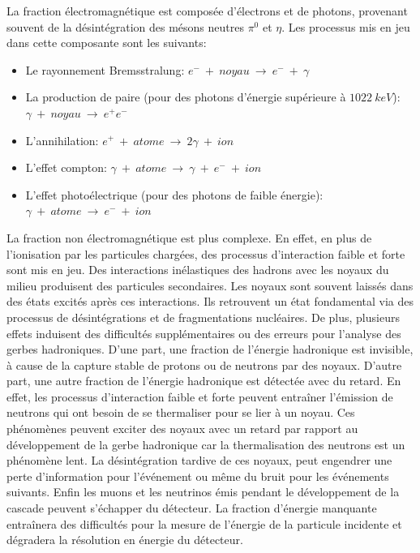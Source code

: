 La fraction électromagnétique est composée d'électrons et de photons, provenant souvent de la désintégration des mésons neutres $\pi^{0}$ et $\eta$. Les processus mis en jeu dans cette composante sont les suivants:  
\begin{itemize}
\item Le rayonnement Bremsstralung: $e^-~+~noyau~\rightarrow~e^-~+~\gamma$ 
\item La production de paire (pour des photons d'énergie supérieure à $1022\ keV$): $\gamma~+~noyau~\rightarrow~e^+e^-$  
\item L'annihilation: $e^+~+~atome~\rightarrow~2\gamma~+~ion$
\item L'effet compton: $\gamma~+~atome~\rightarrow~\gamma~+~e^-~+~ion$
\item L'effet photoélectrique (pour des photons de faible énergie): $\gamma~+~atome~\rightarrow~e^-~+~ion$ 
\end{itemize}
La fraction non électromagnétique est plus complexe. En effet, en plus de l’ionisation par les particules chargées, des processus d'interaction faible et forte sont mis en jeu. Des interactions inélastiques des hadrons avec les noyaux du milieu produisent des particules secondaires. Les noyaux sont souvent laissés dans des états excités après ces interactions. Ils retrouvent un état fondamental via des processus de désintégrations et de fragmentations nucléaires. De plus, plusieurs effets induisent des difficultés supplémentaires ou des erreurs pour l'analyse des gerbes hadroniques. D'une part, une fraction de l'énergie hadronique est invisible, à cause de la capture stable de protons ou de neutrons par des noyaux. 
D'autre part, une autre fraction de l'énergie hadronique est détectée avec du retard. En effet, les processus d'interaction faible et forte peuvent entraîner l'émission de neutrons qui ont besoin de se thermaliser pour se lier à un noyau. Ces phénomènes peuvent exciter des noyaux avec un retard par rapport au développement de la gerbe hadronique car la thermalisation des neutrons est un phénomène lent. La désintégration tardive de ces noyaux, peut engendrer une perte d'information pour l’événement ou même du bruit pour les événements suivants. Enfin les muons et les neutrinos émis pendant le développement de la cascade peuvent s'échapper du détecteur. La fraction d'énergie manquante entraînera des difficultés pour la mesure de l'énergie de la particule incidente et dégradera la résolution en énergie du détecteur.
